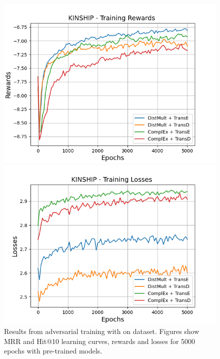 \begin{figure}
    \begin{minipage}{.5\textwidth}
      \centering
      \includegraphics[width=\linewidth]{figures/results/gan_train/pretrained/random/kinship/random_kinship_rew.png}
    \end{minipage}%
     \begin{minipage}{.5\textwidth}
      \centering
      \includegraphics[width=\linewidth]{figures/results/gan_train/pretrained/random/kinship/random_kinship_losses.png}
    \end{minipage}%
    \caption{Results from adversarial training with \origsampling on \kinship dataset.
    Figures show MRR and Hit@10 learning curves, rewards and losses for 5000 epochs with pre-trained models.}
    \label{fig:gan_train_pretrained_random_kinship}
\end{figure}
